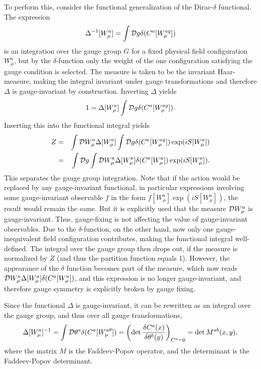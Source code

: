 \documentclass[final,12pt,3p,longtitle]{elsarticle}
\newcommand*{\no}{\noindent}
\newcommand*{\bea}{\begin{eqnarray}}
\newcommand*{\eea}{\end{eqnarray}}
\newcommand*{\be}{\begin{equation}}
\newcommand*{\ee}{\end{equation}}
\newcommand*{\nn}{\nonumber}
\newcommand*{\1}{1\!\!\!\bot}
\begin{document}
To perform this, consider the functional generalization of the Dirac-$\delta$ functional. The expression
\be
\Delta^{-1}[W_\mu^a]=\int {\cal D}g \delta(C^a[W_\mu^{ag}])\nn
\ee
\no is an integration over the gauge group $G$ for a fixed physical field configuration $W_\mu^a$, but by the $\delta$-function only the weight of the one configuration satisfying the gauge condition is selected. The measure is taken to be the invariant Haar-measure, making the integral invariant under gauge transformations and therefore $\Delta$ is gauge-invariant by construction. Inverting $\Delta$ yields
\be
1=\Delta[W_\mu^a]\int{\cal D}g\delta(C^a[W_\mu^{ag}])\label{invertdelta}.
\ee
\no Inserting this into the functional integral yields
\bea
Z&=&\int{\cal D}W_\mu^a \Delta[W_\mu^a]\int{\cal D}g\delta(C^a[W_\mu^{ag}])\exp(iS[W_\mu^a])\nn\\
&=&\int{\cal D}g\int{\cal D}W_\mu^{a}\Delta[W_\mu^{a}]\delta(C^a[W_\mu^{a}])\exp(iS[W_\mu^{a}])\nn.
\eea
\no This separates the gauge group integration. Note that if the action would be replaced by any gauge-invariant functional, in particular expressions involving some gauge-invariant observable $f$ in the form $f[W_\mu^a]\exp(iS[W_\mu^a])$, the result would remain the same. But it is explicitly used that the measure ${\cal D}W_\mu^a$ is gauge-invariant. Thus, gauge-fixing is not affecting the value of gauge-invariant observables. Due to the $\delta$-function, on the other hand, now only one gauge-inequivalent field configuration contributes, making the functional integral well-defined. The integral over the gauge group then drops out, if the measure is normalized by $Z$ (and thus the partition function equals 1). However, the appearance of the $\delta$ function becomes part of the measure, which now reads ${\cal D}W_\mu^a\Delta[W_\mu^{a}]\delta(C^a[W_\mu^{a}])$, and this expression is no longer gauge-invariant, and therefore gauge symmetry is explicitly broken by gauge fixing.

Since the functional $\Delta$ is gauge-invariant, it can be rewritten as an integral over the gauge group, and thus over all gauge transformations,
\be
\Delta[W_\mu^a]^{-1}=\int{\cal D}\theta^a\delta(C^a[W_\mu^{a\theta}])=\left(\det\frac{\delta C^a(x)}{\delta\theta^b(y)}\right)_{C^a=0}=\det M^{ab}(x,y)\nn,
\ee
\no where the matrix $M$ is the Faddeev-Popov operator, and the determinant is the Faddeev-Popov determinant.
\end{document}
